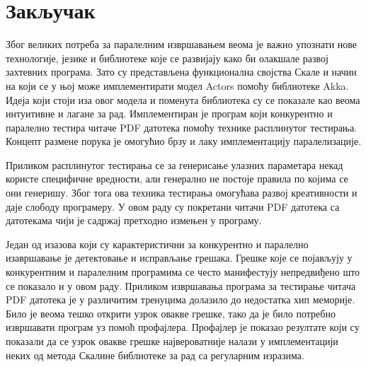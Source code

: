 \documentclass[12pt,oneside]{memoir}
\begin{document}


%



\chapter{Закључак}
\label{chp:zakljucak}


Због великих потреба за паралелним извршавањем веома је важно упознати нове технологије, језике и библиотеке које се развијају како би олакшале развој захтевних програма. Зато су представљена функционална својства Скале и начин на који се у њој може имплементирати модел Actors помоћу библиотеке Akka. Идеја који стоји иза овог модела и поменута библиотека су се показале као веома интуитивне и лагане за рад. Имплементиран је програм који конкурентно и паралелно тестира читаче PDF датотека помоћу технике расплинутог тестирања. Концепт размене порука је омогућио брзу и лаку имплементацију паралелизације. 

Приликом расплинутог тестирања се за генерисање улазних параметара некад користе специфичне вредности, али генерално не постоје правила по којима се они генеришу. Због тога ова техника тестирања омогућава развој креативности и даје слободу програмеру. У овом раду су покретани читачи PDF датотека са датотекама чији је садржај претходно измењен у програму. 

Један од изазова који су карактеристични за конкурентно и паралелно изавршавање је детектовање и исправљање грешака. Грешке које се појављују у конкурентним и паралелним програмима се често манифестују непредвиђено што се показало и у овом раду. Приликом извршавања програма за тестирање читача PDF датотека је у различитим тренуцима долазило до недостатка хип меморије. Било је веома тешко открити узрок овакве грешке, тако да је било потребно извршавати програм уз помоћ профајлера. Профајлер је показао резултате који су показали да се узрок овакве грешке највероватније налази у имплементацији неких од метода Скалине библиотеке за рад са регуларним изразима.
\end{document}
